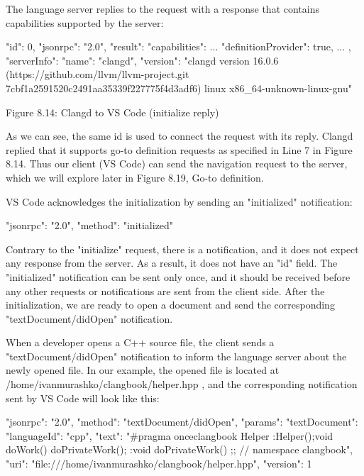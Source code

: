The language server replies to the request with a response that contains capabilities supported by the server:

\begin{shell}
{
  "id": 0,
  "jsonrpc": "2.0",
  "result": {
    "capabilities": {
      ...
      "definitionProvider": true,
      ...
    },
    "serverInfo": {
      "name": "clangd",
      "version": "clangd version 16.0.6 (https://github.com/llvm/llvm-project.git 7cbf1a2591520c2491aa35339f227775f4d3adf6) linux x86_64-unknown-linux-gnu"
    }
  }
}
\end{shell}

Figure 8.14: Clangd to VS Code (initialize reply)

As we can see, the same id is used to connect the request with its reply. Clangd replied that it supports go-to definition requests as specified in Line 7 in Figure 8.14. Thus our client (VS Code) can send the navigation request to the server, which we will explore later in Figure 8.19, Go-to definition.

VS Code acknowledges the initialization by sending an "initialized" notification:

\begin{shell}
{
  "jsonrpc": "2.0",
  "method": "initialized"
}
\end{shell}

Contrary to the "initialize" request, there is a notification, and it does not expect any response from the server. As a result, it does not have an "id" field. The "initialized" notification can be sent only once, and it should be received before any other requests or notifications are sent from the client side. After the initialization, we are ready to open a document and send the corresponding "textDocument/didOpen" notification.


When a developer opens a C++ source file, the client sends a "textDocument/didOpen" notification to inform the language server about the newly opened file. In our example, the opened file is located at /home/ivanmurashko/clangbook/helper.hpp , and the corresponding notification sent by VS Code will look like this:

\begin{shell}
{
  "jsonrpc": "2.0",
  "method": "textDocument/didOpen",
  "params": {
    "textDocument": {
      "languageId": "cpp",
      "text": "#pragma once\n\nnamespace clangbook {\nclass Helper {\npublic:\n  Helper(){};\n\n  void doWork() { doPrivateWork(); }\n\nprivate:\n  void doPrivateWork() {}\n};\n}; // namespace clangbook\n",
      "uri": "file:///home/ivanmurashko/clangbook/helper.hpp",
      "version": 1
     }
   }
}
\end{shell}


